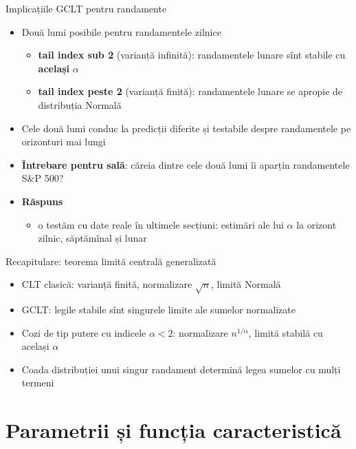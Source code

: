 \begin{frame}{Implicațiile GCLT pentru randamente}
\itemsize{\small}
\begin{itemize}
    \item Două lumi posibile pentru randamentele zilnice
    \begin{itemize}
        \item \textbf{tail index sub 2} (varianță infinită): randamentele lunare sînt stabile cu \textbf{același} $\alpha$
        \item \textbf{tail index peste 2} (varianță finită): randamentele lunare se apropie de distribuția Normală
    \end{itemize}
    \item Cele două lumi conduc la predicții diferite și testabile despre randamentele pe orizonturi mai lungi
    \item \textbf{Întrebare pentru sală}: căreia dintre cele două lumi îi aparțin randamentele S\&P 500?
    \item \textbf{Răspuns}
    \begin{itemize}
        \item o testăm cu date reale în ultimele secțiuni: estimări ale lui $\alpha$ la orizont zilnic, săptămînal și lunar
    \end{itemize}
\end{itemize}
\end{frame}

\begin{frame}{Recapitulare: teorema limită centrală generalizată}
\itemsize{\small}
\begin{itemize}
    \item CLT clasică: varianță finită, normalizare $\sqrt{n}$, limită Normală
    \item GCLT: legile stabile sînt singurele limite ale sumelor normalizate
    \item Cozi de tip putere cu indicele $\alpha < 2$: normalizare $n^{1/\alpha}$, limită stabilă cu același $\alpha$
    \item Coada distribuției unui singur randament determină legea sumelor cu mulți termeni
\end{itemize}
\end{frame}


\section{Parametrii și funcția caracteristică}

